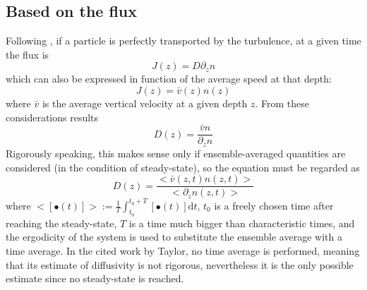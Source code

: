 \subsection{Based on the flux} \label{sec:taylordiff}
Following \autocite{Taylor2016TurbulentEddy}, if a particle is perfectly transported by the turbulence, at a given time the flux is
\[ J(z) = D\partial_z n \]
which can also be expressed in function of the average speed at that depth:
\[ J(z) = \bar{v}(z) n(z) \]
where $\bar{v}$ is the average vertical velocity at a given depth $z$.
From these considerations results
\[ D(z) = \frac{\bar{v} n}{\partial_z n} \]
Rigorously speaking, this makes sense only if ensemble-averaged quantities are considered (in the condition of steady-state), so the equation must be regarded as
\[ D(z) = \frac{ <\bar{v}(z,t) n(z,t)>}{<\partial_z n(z,t)>} \]
where \(<[\bullet(t)]> := \frac{1}{T} \int_{t_0}^{t_0+T} [\bullet(t)] \mathrm{d}t \), $t_0$ is a freely chosen time after reaching the steady-state, $T$ is a time much bigger than characteristic times, and the ergodicity of the system is used to substitute the ensemble average with a time average. In the cited work by Taylor, no time average is performed, meaning that its estimate of diffusivity is not rigorous, nevertheless it is the only possible estimate since no steady-state is reached.
